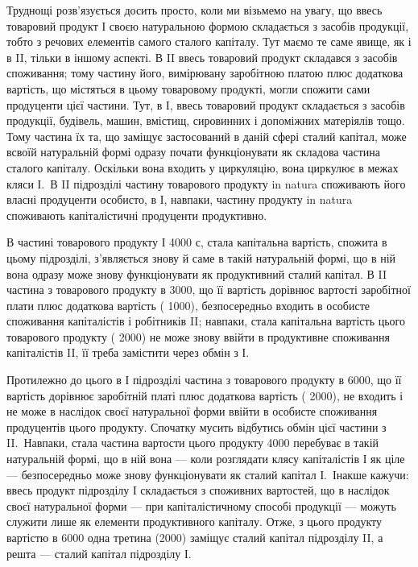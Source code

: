 

Труднощі розв’язується досить просто, коли ми візьмемо на увагу,
що ввесь товаровий продукт І своєю натуральною формою складається
з засобів продукції, тобто з речових елементів самого сталого капіталу.
Тут маємо те саме явище, як і в II, тільки в іншому аспекті. В II ввесь товаровий
продукт складався з засобів споживання; тому частину його, вимірювану
заробітною платою плюс додаткова вартість, що містяться в цьому товаровому
продукті, могли спожити сами продуценти цієї частини. Тут, в
І, ввесь товаровий продукт складається з засобів продукції, будівель, машин,
вмістищ, сировинних і допоміжних матеріялів тощо. Тому частина їх
та, що заміщує застосований в даній сфері сталий капітал, може всвоїй натуральній
формі одразу почати функціонувати як складова частина сталого
капіталу. Оскільки вона входить у циркуляцію, вона циркулює в межах
кляси І.~В II підрозділі частину товарового продукту in natura споживають
його власні продуценти особисто, в І, навпаки, частину продукту
in natura споживають капіталістичні продуценти продуктивно.

В частині товарового продукту І \deq{} 4000 с, стала капітальна вартість,
спожита в цьому підрозділі, з’являється знову й саме в такій натуральній
формі, що в ній вона одразу може знову функціонувати як продуктивний
сталий капітал. В II частина з товарового продукту в 3000, що її вартість
дорівнює вартості заробітної плати плюс додаткова вартість (\deq{} 1000),
безпосередньо входить в особисте споживання капіталістів і робітників II;
навпаки, стала капітальна вартість цього товарового продукту (\deq{} 2000)
не може знову ввійти в продуктивне споживання капіталістів II, її треба
замістити через обмін з І.

Протилежно до цього в І підрозділі частина з товарового продукту
в 6000, що її вартість дорівнює заробітній платі плюс додаткова вартість
(\deq{} 2000), не входить і не може в наслідок своєї натуральної форми
ввійти в особисте споживання продуцентів цього продукту. Спочатку
мусить відбутись обмін цієї частини з II.~Навпаки, стала частина вартости
цього продукту \deq{} 4000 перебуває в такій натуральній формі, що в ній
вона — коли розглядати клясу капіталістів І як ціле — безпосередньо може
знову функціонувати як сталий капітал І.~Інакше кажучи: ввесь продукт
підрозділу І складається з споживних вартостей, що в наслідок своєї натуральної
форми — при капіталістичному способі продукції — можуть служити
лише як елементи продуктивного капіталу. Отже, з цього продукту
вартістю в 6000 одна третина (2000) заміщує сталий капітал підрозділу II,
а решта  — сталий капітал підрозділу І.


